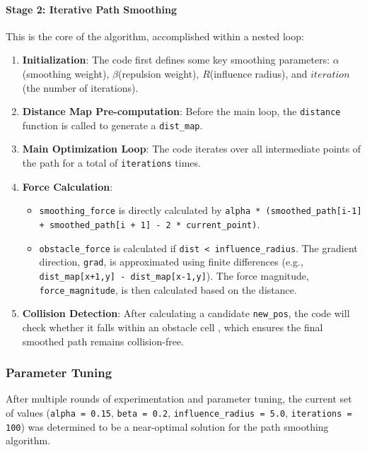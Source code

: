 \documentclass[aps,letterpaper,10pt]{revtex4}
\begin{document}
\paragraph{Stage 2: Iterative Path Smoothing}
This is the core of the algorithm, accomplished within a nested loop:
\begin{enumerate}
    \item \textbf{Initialization}: The code first defines some key smoothing parameters: $\alpha$(smoothing weight), $\beta$(repulsion weight), $R$(influence radius), and $iteration$ (the number of iterations).
    
    \item \textbf{Distance Map Pre-computation}: Before the main loop, the \texttt{distance} function is called to generate a \texttt{dist\_map}.
    
    \item \textbf{Main Optimization Loop}: The code iterates over all intermediate points of the path for a total of \texttt{iterations} times.
    
    \item \textbf{Force Calculation}:
    \begin{itemize}
        \item \texttt{smoothing\_force} is directly calculated by \texttt{alpha * (smoothed\_path[i-1] + smoothed\_path[i + 1] - 2 * current\_point)}.
        \item \texttt{obstacle\_force} is calculated if \texttt{dist < influence\_radius}. The gradient direction, \texttt{grad}, is approximated using finite differences (e.g., \texttt{dist\_map[x+1,y] - dist\_map[x-1,y]}). The force magnitude, \texttt{force\_magnitude}, is then calculated based on the distance.
    \end{itemize}
    
    \item \textbf{Collision Detection}: After calculating a candidate \texttt{new\_pos}, the code will check whether it falls within an obstacle cell , which ensures the final smoothed path remains collision-free.
\end{enumerate}

\subsubsection{Parameter Tuning}
After multiple rounds of experimentation and parameter tuning, the current set of values (\texttt{alpha = 0.15}, \texttt{beta = 0.2}, \texttt{influence\_radius = 5.0}, \texttt{iterations = 100}) was determined to be a near-optimal solution for the path smoothing algorithm. 
\end{document}
